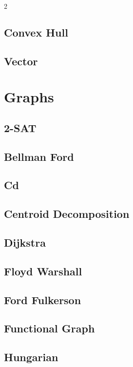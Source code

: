 \documentclass[a4paper,landscape,10pt]{article}
\begin{document}
\begin{multicols*}{2}
\subsection{Convex Hull}

\subsection{Vector}

\section{Graphs}
\subsection{2-SAT}

\subsection{Bellman Ford}

\subsection{Cd}

\subsection{Centroid Decomposition}

\subsection{Dijkstra}

\subsection{Floyd Warshall}

\subsection{Ford Fulkerson}

\subsection{Functional Graph}

\subsection{Hungarian}


\end{multicols*}
\end{document}
